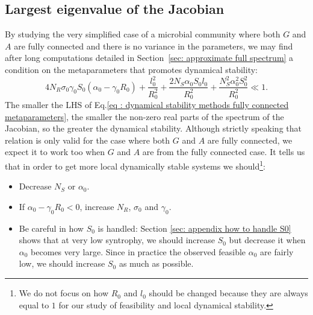 \documentclass[12pt, titlepage]{report}
\begin{document}
\subsection{Largest eigenvalue of the Jacobian} \label{sec: largest eigenvalue of the jacobian}
By studying the very simplified case of a microbial community where both $G$ and $A$ are fully connected and there is no variance in the parameters, we may find after long computations detailed in Section \ref{sec: approximate full spectrum} a condition on the metaparameters that promotes dynamical stability:
\begin{equation}
4N_R \sigma_0 \gamma_0 S_0  (\alpha_0 - \gamma_0 R_0) +\frac{l_0^2}{R_0^2}+\frac{2N_S\alpha_0 S_0 l_0}{R_0^2} + \frac{N_S^2 \alpha_0^2 S_0^2}{R_0^2} \ll 1. \label{eq : dynamical stability methods fully connected metaparameters}
\end{equation}
The smaller the LHS of Eq.\eqref{eq : dynamical stability methods fully connected metaparameters}, the smaller the non-zero real parts of the spectrum of the Jacobian, so the greater the dynamical stability.
Although strictly speaking that relation is only valid for the case where both $G$ and $A$ are fully connected, we expect it to work too when $G$ and $A$ are  from the fully connected case. It tells us that in order to get more local dynamically stable systems we should\footnote{We do not focus on how $R_0$ and $l_0$ should be changed because they are always equal to $1$ for our study of feasibility and local dynamical stability. }:
\begin{itemize}
  \item Decrease $N_S$ %
  or $\alpha_0$.
  \item If $\alpha_0 - \gamma_0 R_0 < 0$, increase $N _R$, $\sigma_0$ and $\gamma_0$.
  \item Be careful in how $S_0$ is handled: %
  Section \ref{sec: appendix how to handle S0} shows that at very low syntrophy, we should increase $S_0$ but decrease it when $\alpha_0$ becomes very large. Since in practice the observed feasible $\alpha_0$ are fairly low, we  should increase $S_0$ as much as possible.
\end{itemize}
\end{document}
